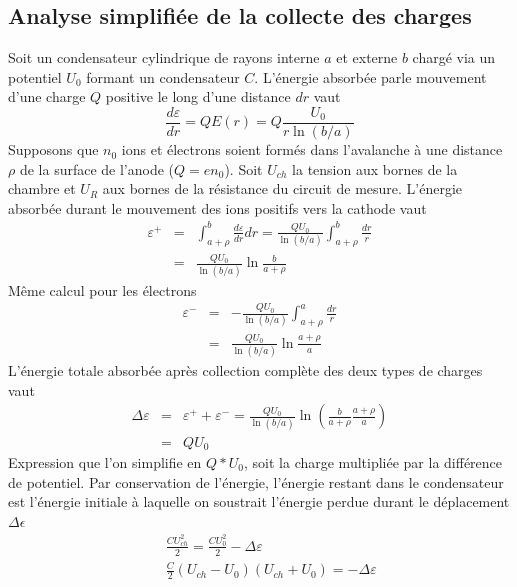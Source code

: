 \subsection{Analyse simplifiée de la collecte des charges}%
Soit un condensateur cylindrique de rayons interne $a$ et externe $b$ chargé via un potentiel 
$U_0$ formant un condensateur $C$. L'énergie absorbée parle mouvement d'une charge $Q$ positive le
long d'une distance $dr$ vaut
\begin{equation}
\frac{d\varepsilon}{dr}=QE(r)=Q\frac{U_0}{r\ln{(b/a)}}
\end{equation}
Supposons que $n_0$ ions et électrons soient formés dans l'avalanche à une distance $\rho$ de la
surface de l'anode ($Q=en_0$). Soit $U_{ch}$ la tension aux bornes de la chambre et $U_R$ aux bornes
de la résistance du circuit de mesure. L'énergie absorbée durant le mouvement des ions positifs vers
la cathode vaut
\begin{eqnarray}
\varepsilon^+&=&\int_{a+\rho}^{b}\frac{d\varepsilon}{dr}dr=\frac{QU_0}{\ln{(b/a)}}\int_{a+\rho}^{b}\frac{dr}{r}\\
&=&\frac{QU_0}{\ln{(b/a)}}\ln{\frac{b}{a+\rho}}
\end{eqnarray}
Même calcul pour les électrons
\begin{eqnarray}
\varepsilon^-&=&-\frac{QU_0}{\ln{(b/a)}}\int_{a+\rho}^{a}\frac{dr}{r}\\
&=&\frac{QU_0}{\ln{(b/a)}}\ln{\frac{a+\rho}{a}}
\end{eqnarray}
L'énergie totale absorbée après collection complète des deux types de charges vaut
\begin{eqnarray}
\Delta\varepsilon&=&\varepsilon^++\varepsilon^-=\frac{QU_0}{\ln{(b/a)}}\ln{\left(\frac{b}{a+\rho}\frac{a+\rho}{a}\right)}\\
&=&QU_0
\end{eqnarray}
Expression que l'on simplifie en $Q*U_0$, soit la charge multipliée par la différence de potentiel.
Par conservation de l'énergie, l'énergie restant dans le condensateur est l'énergie initiale à 
laquelle on soustrait l'énergie perdue durant le déplacement $\Delta \epsilon$
\begin{eqnarray}
&&\frac{CU_{ch}^2}{2}=\frac{CU_{0}^2}{2}-\Delta\varepsilon\\
&&\frac{C}{2}(U_{ch}-U_0)(U_{ch}+U_0)=-\Delta\varepsilon
\end{eqnarray}

